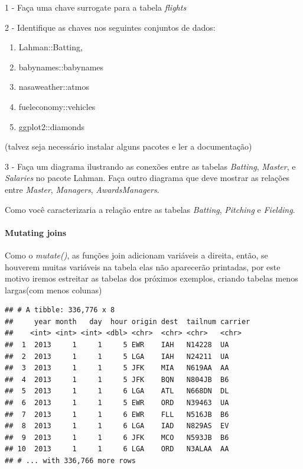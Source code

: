 \documentclass[
]{article}
\newenvironment{Shaded}{\begin{snugshade}}{\end{snugshade}}
\newcommand{\KeywordTok}[1]{\textcolor[rgb]{0.13,0.29,0.53}{\textbf{#1}}}
\newcommand{\NormalTok}[1]{#1}
\newcommand{\OperatorTok}[1]{\textcolor[rgb]{0.81,0.36,0.00}{\textbf{#1}}}
\newcommand{\StringTok}[1]{\textcolor[rgb]{0.31,0.60,0.02}{#1}}
\providecommand{\tightlist}{%
  \setlength{\itemsep}{0pt}\setlength{\parskip}{0pt}}
\begin{document}
1 - Faça uma chave surrogate para a tabela \emph{flights}

2 - Identifique as chaves nos seguintes conjuntos de dados:

\begin{enumerate}
\def\labelenumi{\arabic{enumi}.}
\tightlist
\item
  Lahman::Batting,
\item
  babynames::babynames
\item
  nasaweather::atmos
\item
  fueleconomy::vehicles
\item
  ggplot2::diamonds
\end{enumerate}

(talvez seja necessário instalar alguns pacotes e ler a documentação)

3 - Faça um diagrama ilustrando as conexões entre as tabelas
\emph{Batting}, \emph{Master}, e \emph{Salaries} no pacote Lahman. Faça
outro diagrama que deve mostrar as relações entre \emph{Master},
\emph{Managers}, \emph{AwardsManagers}.

Como você caracterizaria a relação entre as tabelas \emph{Batting},
\emph{Pitching} e \emph{Fielding}.

\hypertarget{mutating-joins}{%
\paragraph{Mutating joins}\label{mutating-joins}}

Como o \emph{mutate()}, as funções join adicionam variáveis a direita,
então, se houverem muitas variáveis na tabela elas não aparecerão
printadas, por este motivo iremos estreitar as tabelas dos próximos
exemplos, criando tabelas menos largas(com menos colunas)

\begin{Shaded}
\end{Shaded}

\begin{verbatim}
## # A tibble: 336,776 x 8
##     year month   day  hour origin dest  tailnum carrier
##    <int> <int> <int> <dbl> <chr>  <chr> <chr>   <chr>  
##  1  2013     1     1     5 EWR    IAH   N14228  UA     
##  2  2013     1     1     5 LGA    IAH   N24211  UA     
##  3  2013     1     1     5 JFK    MIA   N619AA  AA     
##  4  2013     1     1     5 JFK    BQN   N804JB  B6     
##  5  2013     1     1     6 LGA    ATL   N668DN  DL     
##  6  2013     1     1     5 EWR    ORD   N39463  UA     
##  7  2013     1     1     6 EWR    FLL   N516JB  B6     
##  8  2013     1     1     6 LGA    IAD   N829AS  EV     
##  9  2013     1     1     6 JFK    MCO   N593JB  B6     
## 10  2013     1     1     6 LGA    ORD   N3ALAA  AA     
## # ... with 336,766 more rows
\end{verbatim}
\end{document}

